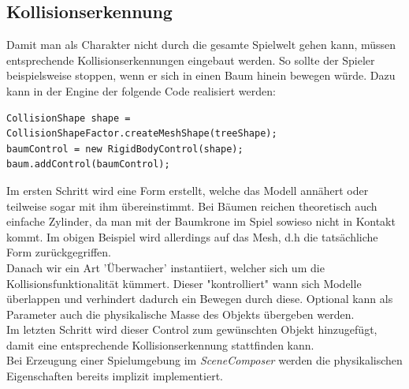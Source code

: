 \subsection{Kollisionserkennung}
Damit man als Charakter nicht durch die gesamte Spielwelt gehen kann, müssen entsprechende Kollisionserkennungen eingebaut werden. So sollte der Spieler beispielsweise stoppen, wenn er sich in einen Baum hinein bewegen würde. Dazu kann in der Engine der folgende Code realisiert werden:


\begin{lstlisting}
CollisionShape shape = CollisionShapeFactor.createMeshShape(treeShape);
baumControl = new RigidBodyControl(shape);
baum.addControl(baumControl);
\end{lstlisting} Im ersten Schritt wird eine Form erstellt, welche das Modell annähert oder teilweise sogar mit ihm übereinstimmt. Bei Bäumen reichen theoretisch auch einfache Zylinder, da man mit der Baumkrone im Spiel sowieso nicht in Kontakt kommt. Im obigen Beispiel wird allerdings auf das Mesh, d.h  die tatsächliche Form zurückgegriffen.\\
Danach wir ein Art 'Überwacher' instantiiert, welcher sich um die Kollisionsfunktionalität kümmert. Dieser "kontrolliert" wann sich Modelle überlappen und verhindert dadurch ein Bewegen durch diese. Optional kann als Parameter auch die physikalische Masse des Objekts übergeben werden.\\
Im letzten Schritt wird dieser Control zum gewünschten Objekt hinzugefügt, damit eine entsprechende Kollisionserkennung stattfinden kann.\\
Bei Erzeugung einer Spielumgebung im \emph{SceneComposer} werden die physikalischen Eigenschaften bereits implizit implementiert.


